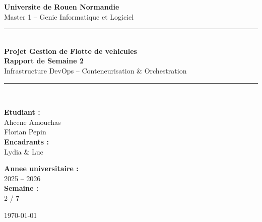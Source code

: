 \documentclass[12pt,a4paper]{article}
\begin{document}
\begin{titlepage}
  \centering
  \vspace*{1cm}

  {\Large\textbf{Universite de Rouen Normandie}\\[0.3cm]
  \large Master 1 -- Genie Informatique et Logiciel}

  \vspace{1.5cm}
  \rule{\linewidth}{0.5mm}\\[0.4cm]

  {\Huge\bfseries\color{primary} Projet Gestion de Flotte de vehicules\\[0.3cm]}
  {\LARGE\bfseries Rapport de Semaine 2}\\[0.3cm]
  {\large\color{darkgray} Infrastructure DevOps -- Conteneurisation \& Orchestration}

  \rule{\linewidth}{0.5mm}\\[1.5cm]

  \begin{minipage}{0.45\textwidth}
    \begin{flushleft}
      \textbf{Etudiant :}\\
      Ahcene Amouchas \\
      Florian Pepin \\[0.5cm]
      \textbf{Encadrants :}\\
      Lydia \& Luc
    \end{flushleft}
  \end{minipage}
  \hfill
  \begin{minipage}{0.45\textwidth}
    \begin{flushright}
      \textbf{Annee universitaire :}\\
      2025 -- 2026\\[0.5cm]
      \textbf{Semaine :}\\
      2 / 7
    \end{flushright}
  \end{minipage}

  \vfill
  {\large\today}
\end{titlepage}

\tableofcontents
\newpage

\end{document}
